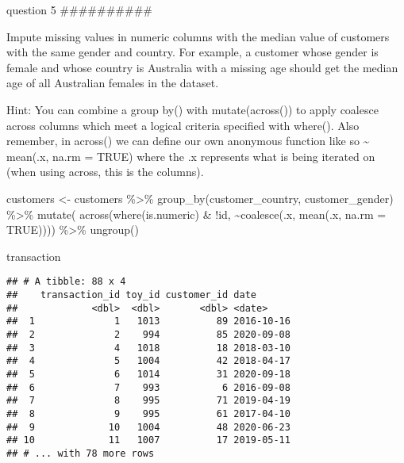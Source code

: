 \documentclass[
]{article}
\newenvironment{Shaded}{\begin{snugshade}}{\end{snugshade}}
\newcommand{\AttributeTok}[1]{\textcolor[rgb]{0.77,0.63,0.00}{#1}}
\newcommand{\ConstantTok}[1]{\textcolor[rgb]{0.00,0.00,0.00}{#1}}
\newcommand{\FunctionTok}[1]{\textcolor[rgb]{0.00,0.00,0.00}{#1}}
\newcommand{\NormalTok}[1]{#1}
\newcommand{\OtherTok}[1]{\textcolor[rgb]{0.56,0.35,0.01}{#1}}
\newcommand{\SpecialCharTok}[1]{\textcolor[rgb]{0.00,0.00,0.00}{#1}}
\begin{document}
question 5 \#\#\#\#\#\#\#\#\#\#

Impute missing values in numeric columns with the median value of
customers with the same gender and country. For example, a customer
whose gender is female and whose country is Australia with a missing age
should get the median age of all Australian females in the dataset.

Hint: You can combine a group by() with mutate(across()) to apply
coalesce across columns which meet a logical criteria specified with
where(). Also remember, in across() we can define our own anonymous
function like so \textasciitilde{} mean(.x, na.rm = TRUE) where the .x
represents what is being iterated on (when using across, this is the
columns).

\begin{Shaded}
\begin{Highlighting}[]
\NormalTok{customers }\OtherTok{\textless{}{-}}\NormalTok{ customers }\SpecialCharTok{\%\textgreater{}\%} 
  \FunctionTok{group\_by}\NormalTok{(customer\_country, customer\_gender) }\SpecialCharTok{\%\textgreater{}\%} 
  \FunctionTok{mutate}\NormalTok{(}
    \FunctionTok{across}\NormalTok{(}\FunctionTok{where}\NormalTok{(is.numeric) }\SpecialCharTok{\&} \SpecialCharTok{!}\NormalTok{id,}
           \SpecialCharTok{\textasciitilde{}}\FunctionTok{coalesce}\NormalTok{(.x, }\FunctionTok{mean}\NormalTok{(.x, }\AttributeTok{na.rm =} \ConstantTok{TRUE}\NormalTok{)))) }\SpecialCharTok{\%\textgreater{}\%} 
  \FunctionTok{ungroup}\NormalTok{()}
\end{Highlighting}
\end{Shaded}

\begin{Shaded}
\begin{Highlighting}[]
\NormalTok{transaction}
\end{Highlighting}
\end{Shaded}

\begin{verbatim}
## # A tibble: 88 x 4
##    transaction_id toy_id customer_id date      
##             <dbl>  <dbl>       <dbl> <date>    
##  1              1   1013          89 2016-10-16
##  2              2    994          85 2020-09-08
##  3              4   1018          18 2018-03-10
##  4              5   1004          42 2018-04-17
##  5              6   1014          31 2020-09-18
##  6              7    993           6 2016-09-08
##  7              8    995          71 2019-04-19
##  8              9    995          61 2017-04-10
##  9             10   1004          48 2020-06-23
## 10             11   1007          17 2019-05-11
## # ... with 78 more rows
\end{verbatim}
\end{document}
